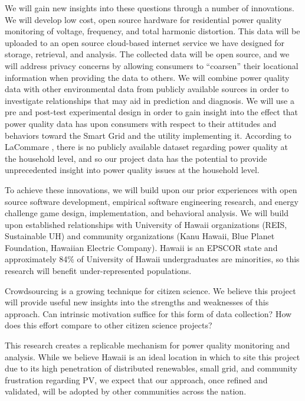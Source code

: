 We will gain new insights into these questions through a number of innovations.  We will develop low cost, open source hardware for residential power quality monitoring of voltage, frequency, and total harmonic distortion. This data will be uploaded to an open source cloud-based internet service we have designed for storage, retrieval, and analysis. The collected data will be open source, and we will address privacy concerns by allowing consumers to ``coarsen'' their locational information when providing the data to others.  We will combine power quality data with other environmental data from publicly available sources in order to investigate relationships that may aid in prediction and diagnosis.  We will use a pre and post-test experimental design in order to gain insight into the effect that power quality data has upon consumers with respect to their attitudes and behaviors toward the Smart Grid and the utility implementing it.  According to LaCommare \cite{LaCommare2004}, there is no publicly available dataset regarding power quality at the household level, and so our project data has the potential to provide unprecedented insight into power quality issues at the household level.

To achieve these innovations, we will build upon our prior experiences with open source software development, empirical software engineering research, and energy challenge game design, implementation, and behavioral analysis. We will build upon established relationships with University of Hawaii organizations (REIS, Sustainable UH) and community organizations (Kanu Hawaii, Blue Planet Foundation, Hawaiian Electric Company).  Hawaii is an EPSCOR state and approximately 84\% of University of Hawaii undergraduates are minorities, so this research will benefit under-represented populations.

Crowdsourcing is a growing technique for citizen science. We believe this project will provide useful new insights into the strengths and weaknesses of this approach. Can intrinsic motivation suffice for this form of data collection? How does this effort compare to other citizen science projects? 

This research creates a replicable mechanism for power quality monitoring and analysis. While we believe Hawaii is an ideal location in which to site this project due to its high penetration of distributed renewables, small grid, and community frustration regarding PV, we expect that our approach, once refined and validated, will be adopted by other communities across the nation. 




